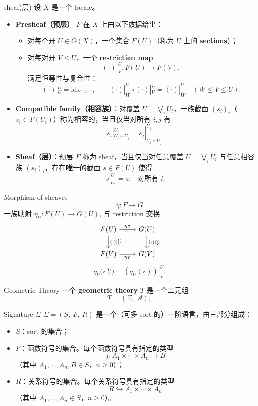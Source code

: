 \documentclass{beamer}
\begin{document}
\begin{frame}[fragile]{sheaf(层)}
设 \(X\) 是一个 locale。

\begin{itemize}
\item \textbf{Presheaf（预层）} \(F\) 在 \(X\) 上由以下数据给出：
  \begin{itemize}
  \item 对每个开 \(U\in O(X)\)，一个集合 \(F(U)\)（称为 \(U\) 上的 \textbf{sections}）；
  \item 对每对开 \(V\leq U\)，一个 \textbf{restriction map}
    \[
    (\cdot)|_V^U:F(U)\to F(V),
    \]
  满足恒等性与复合性：
  \[
  (\cdot)|_U^U=\mathrm{id}_{F(U)},\qquad
  (\cdot)|_W^V\circ(\cdot)|_V^U=(\cdot)|_W^U
  \quad(W\leq V\leq U).
  \]
  \end{itemize}

\item \textbf{Compatible family（相容族）}：对覆盖 \(U=\bigvee_i U_i\)，一族截面 \((s_i)_i\)（\(s_i\in F(U_i)\)）称为相容的，当且仅当对所有 \(i,j\) 有
  \[
  s_i|_{U_i\wedge U_j}^{U_i}=s_j|_{U_i\wedge U_j}^{U_j}.
  \]

\item \textbf{Sheaf（层）}：预层 \(F\) 称为 sheaf，当且仅当对任意覆盖 \(U=\bigvee_i U_i\) 与任意相容族 \((s_i)_i\)，存在\textbf{唯一}的截面 \(s\in F(U)\) 使得
  \[
  s|_{U_i}^U=s_i\quad\text{对所有 }i.
  \]
\end{itemize}
\end{frame}

\begin{frame}[fragile]{Morphism of sheaves}
\[ \eta : F \to G \]
一族映射 $\eta_{U} : F(U) \to G(U)$, 与 restriction 交换
\[
\begin{tikzcd}
F(U) \arrow[r, "\eta_U"] \arrow[d,"(\cdot)|_V^U"] & G(U) \arrow[d,"(\cdot)|_V^U"] \\
F(V) \arrow[r, "\eta_V"'] & G(V)
\end{tikzcd}
\]
  \[
  \eta_V(s|_V^U)=(\eta_U(s))|_V^U.
  \]
\end{frame}

\begin{frame}[fragile]{Geometric Theory}
一个 \textbf{geometric theory} $T$ 是一个二元组
\[
T = (\Sigma,\ \mathcal{A}),
\]
\end{frame}

\begin{frame}{Signature $\Sigma$}
$\Sigma = (S,\ F,\ R)$ 是一个（可多 sort 的）一阶语言，由三部分组成：

\begin{itemize}
    \item $S$：sort 的集合；
    \item $F$：函数符号的集合。每个函数符号具有指定的类型
    \[
    f : A_1\times\cdots\times A_n \to B
    \]
    （其中 $A_1,\dots,A_n,B\in S$，$n\geq 0$）；
    \item $R$：关系符号的集合。每个关系符号具有指定的类型
    \[
    R \hookrightarrow A_1\times\cdots\times A_n
    \]
    （其中 $A_1,\dots,A_n\in S$，$n\geq 0$）。
\end{itemize}
\end{frame}
\end{document}
